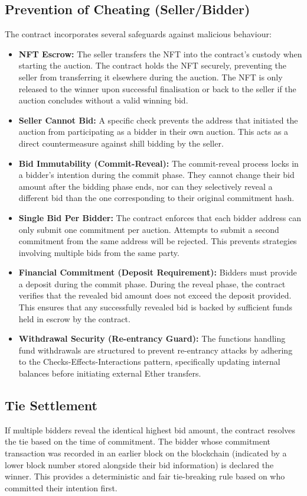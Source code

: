 \documentclass[11pt, a4paper]{article}
\begin{document}
\subsection{Prevention of Cheating (Seller/Bidder)}
The contract incorporates several safeguards against malicious behaviour:
\begin{itemize}
    \item \textbf{NFT Escrow:} The seller transfers the NFT into the contract's custody when starting the auction. The contract holds the NFT securely, preventing the seller from transferring it elsewhere during the auction. The NFT is only released to the winner upon successful finalisation or back to the seller if the auction concludes without a valid winning bid.
    \item \textbf{Seller Cannot Bid:} A specific check prevents the address that initiated the auction from participating as a bidder in their own auction. This acts as a direct countermeasure against shill bidding by the seller.
    \item \textbf{Bid Immutability (Commit-Reveal):} The commit-reveal process locks in a bidder's intention during the commit phase. They cannot change their bid amount after the bidding phase ends, nor can they selectively reveal a different bid than the one corresponding to their original commitment hash.
    \item \textbf{Single Bid Per Bidder:} The contract enforces that each bidder address can only submit one commitment per auction. Attempts to submit a second commitment from the same address will be rejected. This prevents strategies involving multiple bids from the same party.
    \item \textbf{Financial Commitment (Deposit Requirement):} Bidders must provide a deposit during the commit phase. During the reveal phase, the contract verifies that the revealed bid amount does not exceed the deposit provided. This ensures that any successfully revealed bid is backed by sufficient funds held in escrow by the contract.
    \item \textbf{Withdrawal Security (Re-entrancy Guard):} The functions handling fund withdrawals are structured to prevent re-entrancy attacks by adhering to the Checks-Effects-Interactions pattern, specifically updating internal balances before initiating external Ether transfers.
\end{itemize}

\subsection{Tie Settlement}
If multiple bidders reveal the identical highest bid amount, the contract resolves the tie based on the time of commitment. The bidder whose commitment transaction was recorded in an earlier block on the blockchain (indicated by a lower block number stored alongside their bid information) is declared the winner. This provides a deterministic and fair tie-breaking rule based on who committed their intention first.
\end{document}
